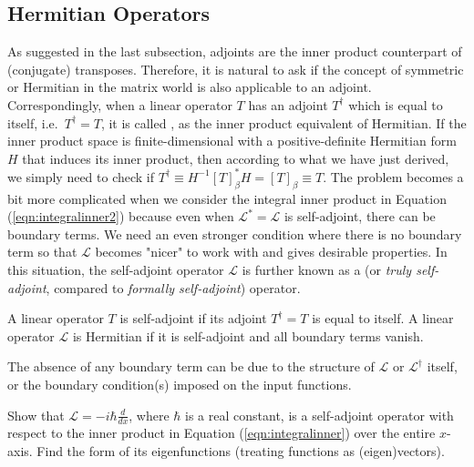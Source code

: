 \subsection{Hermitian Operators}
As suggested in the last subsection, adjoints are the inner product counterpart of (conjugate) transposes. Therefore, it is natural to ask if the concept of symmetric or Hermitian in the matrix world is also applicable to an adjoint. Correspondingly, when a linear operator $T$ has an adjoint $T^\dag$ which is equal to itself, i.e.\ $T^\dag = T$, it is called , as the inner product equivalent of Hermitian. If the inner product space is finite-dimensional with a positive-definite Hermitian form $H$ that induces its inner product, then according to what we have just derived, we simply need to check if $T^\dag \equiv H^{-1} [T]_\beta^* H = [T]_\beta \equiv T$. The problem becomes a bit more complicated when we consider the integral inner product in Equation (\ref{eqn:integralinner2}) because even when $\mathcal{L}^* = \mathcal{L}$ is self-adjoint, there can be boundary terms. We need an even stronger condition where there is no boundary term so that $\mathcal{L}$ becomes "nicer" to work with and gives desirable properties. In this situation, the self-adjoint operator $\mathcal{L}$ is further known as a  (or \textit{truly self-adjoint}, compared to \textit{formally self-adjoint}) operator.
\begin{defn}
\label{defn:selfadjoint}
A linear operator $T$ is self-adjoint if its adjoint $T^\dag = T$ is equal to itself. A linear operator $\mathcal{L}$ is Hermitian if it is self-adjoint and all boundary terms vanish.
\end{defn}
The absence of any boundary term can be due to the structure of $\mathcal{L}$ or $\mathcal{L}^\dag$ itself, or the boundary condition(s) imposed on the input functions. 
\begin{exmp}
Show that $\mathcal{L} = -i\hbar\frac{d}{dx}$, where $\hbar$ is a real constant, is a self-adjoint operator with respect to the inner product in Equation (\ref{eqn:integralinner}) over the entire $x$-axis. Find the form of its eigenfunctions (treating functions as (eigen)vectors).
\end{exmp}
